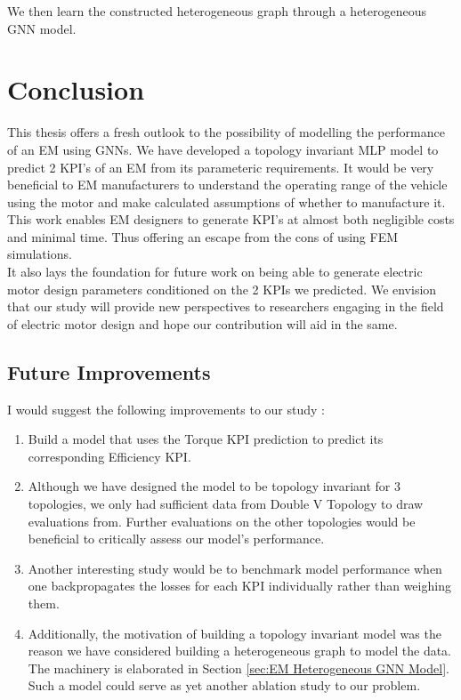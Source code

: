 \documentclass{report} %
\begin{document}
We then learn the constructed heterogeneous graph through a heterogeneous \ac{GNN} model.\\   

\newpage 

\chapter{Conclusion}

This thesis offers a fresh outlook to the possibility of modelling the performance of an \ac{EM} using \ac{GNN}s.
We have developed a topology invariant \ac{MLP} model to predict 2 \ac{KPI}'s of an \ac{EM} from its parameteric requirements. 
It would be very beneficial to \ac{EM} manufacturers to understand the operating range of the vehicle using the motor and make calculated assumptions of whether to manufacture it.\\
This work enables \ac{EM} designers to generate \ac{KPI}'s at almost both negligible costs and minimal time.
Thus offering an escape from the cons of using \ac{FEM} simulations.\\
It also lays the foundation for future work on being able to generate electric motor design parameters conditioned on the 2 KPIs we predicted.
We envision that our study will provide new perspectives to researchers engaging in the field of electric motor design and hope our contribution will aid in the same.\\
\section{Future Improvements}\label{sec:Future Improvements}

I would suggest the following improvements to our study : 

\begin{enumerate}
    \item Build a model that uses the Torque \ac{KPI} prediction to predict its corresponding Efficiency \ac{KPI}. 
    \item Although we have designed the model to be topology invariant for 3 topologies, we only had sufficient data from Double V Topology to draw evaluations from.
    Further evaluations on the other topologies would be beneficial to critically assess our model's performance.
    \item Another interesting study would be to benchmark model performance when one backpropagates the losses for each \ac{KPI} individually rather than weighing them.
    \item Additionally, the motivation of building a topology invariant model was the reason we have considered building a heterogeneous graph to model the data. The machinery is elaborated in Section \ref{sec:EM Heterogeneous GNN Model}.
    Such a model could serve as yet another ablation study to our problem.
\end{enumerate}
\end{document}
